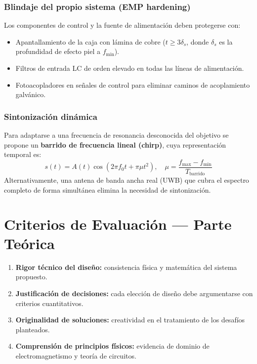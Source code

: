 \documentclass[11pt,a4paper]{article}
\begin{document}
\subsubsection{Blindaje del propio sistema (EMP hardening)}

Los componentes de control y la fuente de alimentación deben protegerse con:
\begin{itemize}
  \item Apantallamiento de la caja con lámina de cobre ($t \geq 3\delta_s$, donde $\delta_s$ es la profundidad de efecto piel a $f_{\min}$).
  \item Filtros de entrada LC de orden elevado en todas las líneas de alimentación.
  \item Fotoacopladores en señales de control para eliminar caminos de acoplamiento galvánico.
\end{itemize}

\subsubsection{Sintonización dinámica}

Para adaptarse a una frecuencia de resonancia desconocida del objetivo se propone un
\textbf{barrido de frecuencia lineal (chirp)}, cuya representación temporal es:
\begin{equation}
  s(t) = A(t)\cos\!\left(2\pi f_0 t + \pi \mu t^2\right), \quad
  \mu = \frac{f_{\max}-f_{\min}}{T_{\text{barrido}}}
  \label{eq:chirp}
\end{equation}
Alternativamente, una antena de banda ancha real (UWB) que cubra el espectro completo
de forma simultánea elimina la necesidad de sintonización.

\section{Criterios de Evaluación --- Parte Teórica}

\begin{criteriobox}[title={Rúbrica de evaluación teórica}, fonttitle=\small\bfseries\color{verdemed}]
\begin{enumerate}
  \item \textbf{Rigor técnico del diseño:} consistencia física y matemática del sistema propuesto.
  \item \textbf{Justificación de decisiones:} cada elección de diseño debe argumentarse con criterios cuantitativos.
  \item \textbf{Originalidad de soluciones:} creatividad en el tratamiento de los desafíos planteados.
  \item \textbf{Comprensión de principios físicos:} evidencia de dominio de electromagnetismo y teoría de circuitos.
\end{enumerate}
\end{criteriobox}
\end{document}

